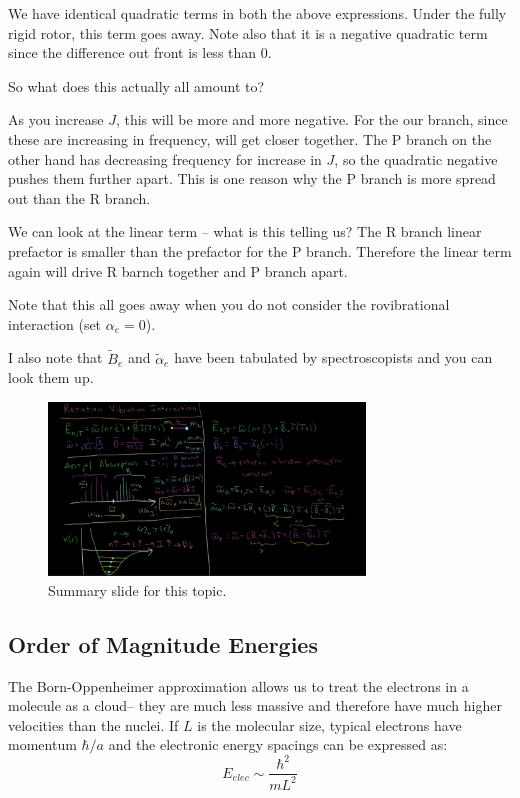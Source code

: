 \documentclass{article}
\begin{document}
We have identical quadratic terms in both the above expressions. Under the fully rigid rotor, this term goes away. Note also that it is a negative quadratic term since the difference out front is less than 0. 

So what does this actually all amount to?

As you increase $J$, this will be more and more negative. For the our branch, since these are increasing in frequency, will get closer together. The P branch on the other hand has decreasing frequency for increase in $J$, so the quadratic negative pushes them further apart. This is one reason why the P branch is more spread out than the R branch.

We can look at the linear term -- what is this telling us? The R branch linear prefactor is smaller than the prefactor for the P branch. Therefore the linear term again will drive R barnch together and P branch apart.

Note that this all goes away when you do not consider the rovibrational interaction (set $\alpha_e = 0$). 

I also note that $\tilde B_e$ and $\tilde \alpha_e$ have been tabulated by spectroscopists and you can look them up. 

\begin{figure}
    \centering
    \includegraphics[width=0.75\textwidth]{Screen Shot 2020-09-27 at 6.44.40 PM.png}
    \caption{Summary slide for this topic. }
    \label{fig:summ}
\end{figure}

\subsection{Order of Magnitude Energies}
The Born-Oppenheimer approximation allows us to treat the electrons in a molecule as a cloud-- they are much less massive and therefore have much higher velocities than the nuclei. If $L$ is the molecular size, typical electrons have momentum $\hbar /a$ and the electronic energy spacings can be expressed as:
$$ E_{elec} \sim \frac{\hbar^2}{mL^2}$$
\end{document}
